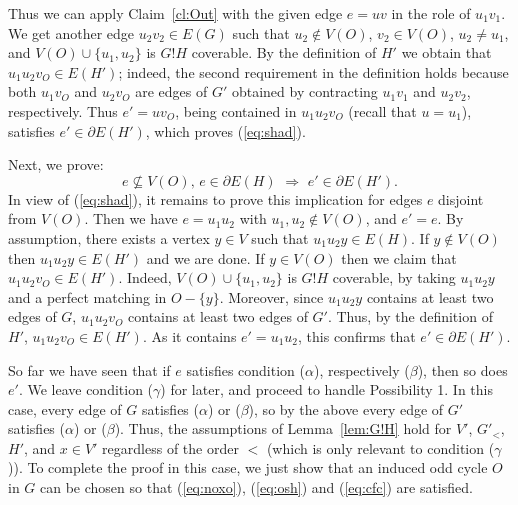 \documentclass[10pt,a4paper]{amsart}
\begin{document}
Thus we can apply Claim~\ref{cl:Out} with the given edge $e = uv$ in the role of $u_1v_1$. We get another edge $u_2v_2 \in E(G)$ such that $u_2 \notin V(O)$, $v_2 \in V(O)$, $u_2 \ne u_1$, and $V(O) \cup \{u_1, u_2\}$ is $G!H$ coverable. By the definition of $H'$ we obtain that $u_1u_2v_O \in E(H')$; indeed, the second requirement in the definition holds because both $u_1v_O$ and $u_2v_O$ are edges of $G'$ obtained by contracting $u_1v_1$ and $u_2v_2$, respectively. Thus $e' = uv_O$, being contained in $u_1u_2v_O$ (recall that $u = u_1$), satisfies $e' \in \partial E(H')$, which proves (\ref{eq:shad}).

Next, we prove:
\begin{equation} \label{eq:con2}
e \nsubseteq V(O),\, e \in \partial E(H)\,\,\Longrightarrow\,\, e' \in \partial E(H').
\end{equation}
In view of (\ref{eq:shad}), it remains to prove this implication for edges $e$ disjoint from $V(O)$. Then we have $e = u_1u_2$ with $u_1, u_2 \notin V(O)$, and $e' = e$. By assumption, there exists a vertex $y \in V$ such that $u_1u_2y \in E(H)$. If $y \notin V(O)$ then $u_1u_2y \in E(H')$ and we are done. If $y \in V(O)$ then we claim that $u_1u_2v_O \in E(H')$. Indeed, $V(O) \cup \{u_1, u_2\}$ is $G!H$ coverable, by taking $u_1u_2y$ and a perfect matching in $O - \{y\}$. Moreover, since $u_1u_2y$ contains at least two edges of $G$, $u_1u_2v_O$ contains at least two edges of $G'$. Thus, by the definition of $H'$, $u_1u_2v_O \in E(H')$. As it contains $e' = u_1u_2$, this confirms that $e' \in \partial E(H')$.

So far we have seen that if $e$ satisfies condition ($\alpha$), respectively ($\beta$), then so does $e'$. We leave condition ($\gamma$) for later, and proceed to handle Possibility 1. In this case, every edge of $G$ satisfies ($\alpha$) or ($\beta$), so by the above every edge of $G'$ satisfies ($\alpha$) or ($\beta$). Thus, the assumptions of Lemma~\ref{lem:G!H} hold for $V'$, $G'_<$, $H'$, and $x \in V'$ regardless of the order $<$ (which is only relevant to condition ($\gamma$)). To complete the proof in this case, we just show that an induced odd cycle $O$ in $G$ can be chosen so that (\ref{eq:noxo}), (\ref{eq:osh}) and (\ref{eq:cfc}) are satisfied.
\end{document}
